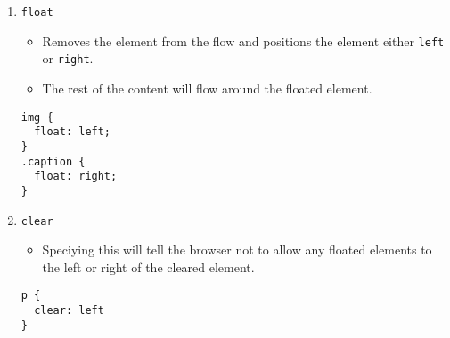 \documentclass[10pt, twocolumn]{article}
\begin{document}
\begin{enumerate}
\item{\texttt{float}}
\begin{itemize}
    \item Removes the element from the flow and positions the element either \texttt{left} or \texttt{right}. 
    \item The rest of the content will flow around the floated element.
\end{itemize}    
\begin{lstlisting}[frame=single]
img {
  float: left;
}
.caption {
  float: right;
}
\end{lstlisting}

\item{\texttt{clear}}
\begin{itemize}
    \item Speciying this will tell the browser not to allow any floated elements to the left or right of the cleared element.
\end{itemize}    
\begin{lstlisting}[frame=single]
p {
  clear: left
}   
\end{lstlisting}
\end{enumerate}
\end{document}
